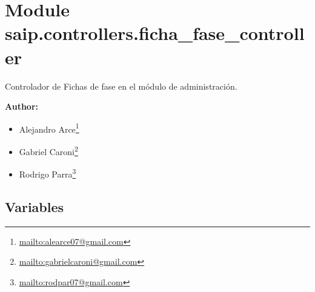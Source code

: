%
%
%


\section{Module saip.controllers.ficha\_fase\_controller}

    \label{saip:controllers:ficha_fase_controller}
Controlador de Fichas de fase en el módulo de administración.

\textbf{Author:} \begin{itemize}
\setlength{\parskip}{0.6ex}
  \item Alejandro 
    Arce\footnote{\href{mailto:alearce07@gmail.com}{mailto:alearce07@gmail.com}}

  \item Gabriel 
    Caroni\footnote{\href{mailto:gabrielcaroni@gmail.com}{mailto:gabrielcaroni@gmail.com}}

  \item Rodrigo 
    Parra\footnote{\href{mailto:rodpar07@gmail.com}{mailto:rodpar07@gmail.com}}

\end{itemize}





  \subsection{Variables}

